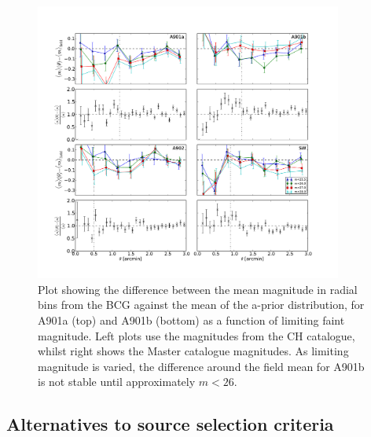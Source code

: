 \documentclass[useAMS,usenatbib,times,letter,amssymb]{mn2e}
\begin{document}
\begin{figure}
\centering
\includegraphics[width = 0.9\textwidth]{Figures/Data/magDiff_InRadialBins_CH_A901ab_A902_SW_withCC.pdf}
\caption{Plot showing the difference between the mean magnitude in radial bins from the BCG against the mean of the a-prior distribution, for A901a (top) and A901b (bottom) as a function of limiting faint magnitude.  Left plots use the magnitudes from the CH catalogue, whilst right shows the Master catalogue magnitudes. As limiting magnitude is varied, the difference around the field mean for A901b is not stable until approximately $m<26$.} \label{fig:magDiff_byMeasure}
\end{figure}

\subsection{Alternatives to source selection criteria}
\end{document}
